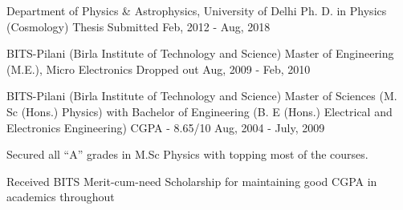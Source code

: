 

\begin{cventries}

	\cventry
	{Department of Physics \& Astrophysics, University of Delhi} %
	{Ph. D. in Physics (Cosmology) } %
	{Thesis Submitted} %
	{Feb, 2012 - Aug, 2018} %
	 {~}
	
  
    \cventry
    {BITS-Pilani (Birla Institute of Technology and Science)} %
    {Master of Engineering (M.E.), Micro Electronics} %
    {Dropped out} %
    {Aug, 2009 - Feb, 2010} %
    {~}
    
    \cventry
    {BITS-Pilani (Birla Institute of Technology and Science)} %
    {Master of Sciences (M. Sc (Hons.) Physics) with Bachelor of Engineering (B. E (Hons.) Electrical and Electronics Engineering)} %
    {CGPA - 8.65/10} %
    {Aug, 2004 - July, 2009} %
    {
      \begin{cvitems} %
        \item {Secured all “A” grades in M.Sc Physics with topping most of the courses.}
	\item {Received BITS Merit-cum-need Scholarship for maintaining good CGPA in academics throughout}
      \end{cvitems}
    }

\end{cventries}
